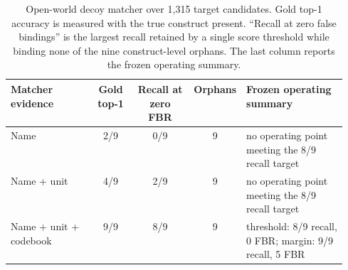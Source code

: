 \begin{table}[t]
\caption{Open-world decoy matcher over 1,315 target candidates. Gold top-1 accuracy is measured with the true construct present. ``Recall at zero false bindings'' is the largest recall retained by a single score threshold while binding none of the nine construct-level orphans. The last column reports the frozen operating summary.}
\label{tab:app-correspondence-decoy-matcher}
\label{tab:app_decoy_matcher}
\centering\scriptsize
\setlength{\tabcolsep}{5pt}
\begin{tabular}{P{0.25\linewidth}cccP{0.30\linewidth}}
\toprule Matcher evidence & Gold top-1 & Recall at zero FBR & Orphans & Frozen operating summary \\
\midrule
Name & 2/9 & 0/9 & 9 & no operating point meeting the 8/9 recall target \\
Name + unit & 4/9 & 2/9 & 9 & no operating point meeting the 8/9 recall target \\
Name + unit + codebook & 9/9 & 8/9 & 9 & threshold: 8/9 recall, 0 FBR; margin: 9/9 recall, 5 FBR \\
\bottomrule\end{tabular}
\end{table}
